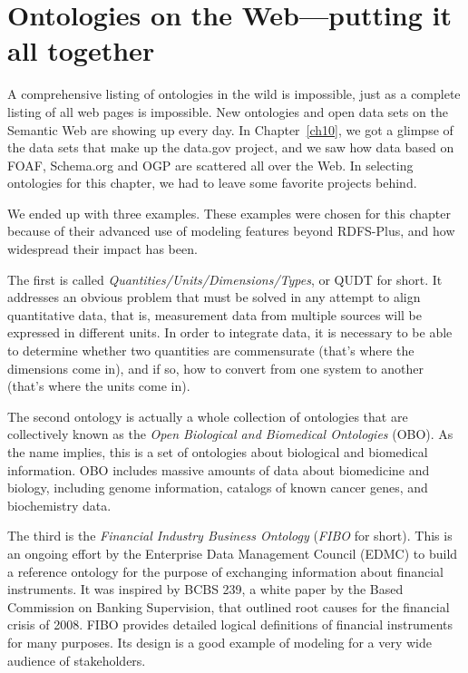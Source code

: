 \chapter{Ontologies on the Web---putting it all together}
\label{ch14}

A comprehensive listing of ontologies in the wild is impossible, just as
a complete listing of all web pages is impossible. New ontologies and
open data sets on the Semantic Web are showing up every day. In Chapter~\ref{ch10}, we got a glimpse of the data sets that make up the data.gov project,
and we saw how data based on FOAF, Schema.org and OGP are scattered all over the
Web. In selecting ontologies for this chapter, we had to leave some
favorite projects behind.

We ended up with three examples. These examples were chosen for this
chapter because of their advanced use of modeling features beyond
RDFS-Plus, and how widespread their impact has been.


The first is called \emph{Quantities/Units/Dimensions/Types}, or QUDT for
short. It addresses an obvious problem that must be solved in any
attempt to align quantitative data, that is, measurement data from
multiple sources will be expressed in different units. In order to
integrate data, it is necessary to be able to determine whether two
quantities are commensurate (that's where the dimensions come in), and
if so, how to convert from one system to another (that's where the units
come in).

The second ontology is actually a whole collection of ontologies that are
collectively known as the \emph{Open Biological and Biomedical Ontologies}
(OBO). As the name implies, this is a set of ontologies about biological
and biomedical information.  OBO includes
massive amounts of data about biomedicine and biology, including genome
information, catalogs of known cancer genes, and biochemistry data.


The third is the \emph{Financial Industry Business Ontology} (\emph{FIBO} for short).
This is an ongoing effort by the Enterprise Data Management Council (EDMC) to 
build a reference ontology for the purpose of exchanging information about 
financial instruments.  It was inspired by
BCBS 239\cite{basel2013principles}, a white paper by the Based Commission 
on Banking Supervision, that outlined root causes for the financial crisis of
2008.  FIBO provides detailed logical definitions of financial instruments
for many purposes.  Its design is a good example of modeling for a very wide
audience of stakeholders. 


